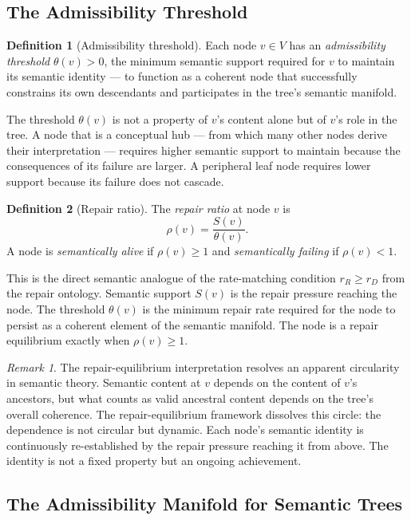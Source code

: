 \documentclass[11pt, a4paper]{article}
\theoremstyle{definition}
\newtheorem{definition}{Definition}
\theoremstyle{remark}
\newtheorem{remark}{Remark}
\begin{document}
\subsection{The Admissibility Threshold}

\begin{definition}[Admissibility threshold]
Each node $v \in V$ has an \textit{admissibility threshold} $\theta(v) > 0$,
the minimum semantic support required for $v$ to maintain its semantic identity
--- to function as a coherent node that successfully constrains its own
descendants and participates in the tree's semantic manifold.
\end{definition}

The threshold $\theta(v)$ is not a property of $v$'s content alone but of
$v$'s role in the tree. A node that is a conceptual hub --- from which many
other nodes derive their interpretation --- requires higher semantic support
to maintain because the consequences of its failure are larger. A peripheral
leaf node requires lower support because its failure does not cascade.

\begin{definition}[Repair ratio]
The \textit{repair ratio} at node $v$ is
\[
\rho(v) = \frac{S(v)}{\theta(v)}.
\]
A node is \textit{semantically alive} if $\rho(v) \geq 1$ and
\textit{semantically failing} if $\rho(v) < 1$.
\end{definition}

This is the direct semantic analogue of the rate-matching condition
$r_R \geq r_D$ from the repair ontology. Semantic support $S(v)$ is the
repair pressure reaching the node. The threshold $\theta(v)$ is the minimum
repair rate required for the node to persist as a coherent element of the
semantic manifold. The node is a repair equilibrium exactly when $\rho(v) \geq 1$.

\begin{remark}
The repair-equilibrium interpretation resolves an apparent circularity in
semantic theory. Semantic content at $v$ depends on the content of $v$'s
ancestors, but what counts as valid ancestral content depends on the tree's
overall coherence. The repair-equilibrium framework dissolves this circle:
the dependence is not circular but dynamic. Each node's semantic identity
is continuously re-established by the repair pressure reaching it from above.
The identity is not a fixed property but an ongoing achievement.
\end{remark}

\subsection{The Admissibility Manifold for Semantic Trees}
\end{document}
